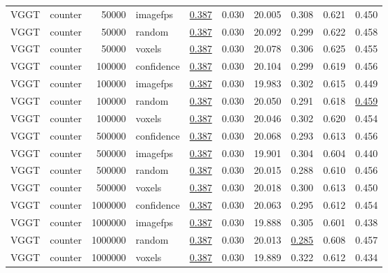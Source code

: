 \begin{table}[H]
\begin{tabular}{llrlrrrrrr}
VGGT & counter & 50000 & imagefps & \underline{0.387} & 0.030 & 20.005 & 0.308 & 0.621 & 0.450 \\
VGGT & counter & 50000 & random & \underline{0.387} & 0.030 & 20.092 & 0.299 & 0.622 & 0.458 \\
VGGT & counter & 50000 & voxels & \underline{0.387} & 0.030 & 20.078 & 0.306 & 0.625 & 0.455 \\
VGGT & counter & 100000 & confidence & \underline{0.387} & 0.030 & 20.104 & 0.299 & 0.619 & 0.456 \\
VGGT & counter & 100000 & imagefps & \underline{0.387} & 0.030 & 19.983 & 0.302 & 0.615 & 0.449 \\
VGGT & counter & 100000 & random & \underline{0.387} & 0.030 & 20.050 & 0.291 & 0.618 & \underline{0.459} \\
VGGT & counter & 100000 & voxels & \underline{0.387} & 0.030 & 20.046 & 0.302 & 0.620 & 0.454 \\
VGGT & counter & 500000 & confidence & \underline{0.387} & 0.030 & 20.068 & 0.293 & 0.613 & 0.456 \\
VGGT & counter & 500000 & imagefps & \underline{0.387} & 0.030 & 19.901 & 0.304 & 0.604 & 0.440 \\
VGGT & counter & 500000 & random & \underline{0.387} & 0.030 & 20.015 & 0.288 & 0.610 & 0.456 \\
VGGT & counter & 500000 & voxels & \underline{0.387} & 0.030 & 20.018 & 0.300 & 0.613 & 0.450 \\
VGGT & counter & 1000000 & confidence & \underline{0.387} & 0.030 & 20.063 & 0.295 & 0.612 & 0.454 \\
VGGT & counter & 1000000 & imagefps & \underline{0.387} & 0.030 & 19.888 & 0.305 & 0.601 & 0.438 \\
VGGT & counter & 1000000 & random & \underline{0.387} & 0.030 & 20.013 & \underline{0.285} & 0.608 & 0.457 \\
VGGT & counter & 1000000 & voxels & \underline{0.387} & 0.030 & 19.889 & 0.322 & 0.612 & 0.434 \\
\bottomrule
\end{tabular}
\end{table}